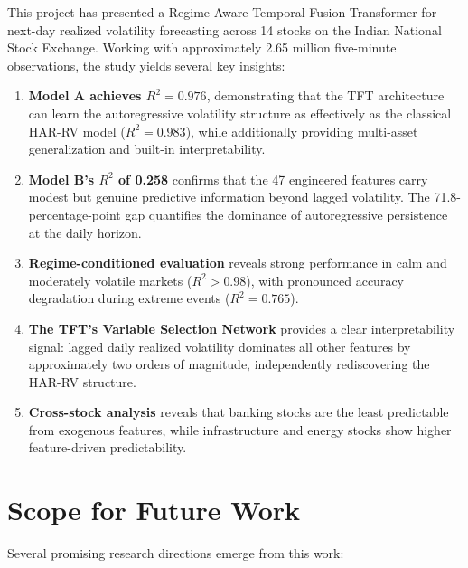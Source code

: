 This project has presented a Regime-Aware Temporal Fusion Transformer for next-day realized volatility forecasting across 14 stocks on the Indian National Stock Exchange. Working with approximately 2.65 million five-minute observations, the study yields several key insights:

\begin{enumerate}
    \item \textbf{Model A achieves $R^2 = 0.976$}, demonstrating that the TFT architecture can learn the autoregressive volatility structure as effectively as the classical HAR-RV model ($R^2 = 0.983$), while additionally providing multi-asset generalization and built-in interpretability.

    \item \textbf{Model B's $R^2$ of 0.258} confirms that the 47 engineered features carry modest but genuine predictive information beyond lagged volatility. The 71.8-percentage-point gap quantifies the dominance of autoregressive persistence at the daily horizon.

    \item \textbf{Regime-conditioned evaluation} reveals strong performance in calm and moderately volatile markets ($R^2 > 0.98$), with pronounced accuracy degradation during extreme events ($R^2 = 0.765$).

    \item \textbf{The TFT's Variable Selection Network} provides a clear interpretability signal: lagged daily realized volatility dominates all other features by approximately two orders of magnitude, independently rediscovering the HAR-RV structure.

    \item \textbf{Cross-stock analysis} reveals that banking stocks are the least predictable from exogenous features, while infrastructure and energy stocks show higher feature-driven predictability.
\end{enumerate}

\pagebreak
\section{Scope for Future Work}

Several promising research directions emerge from this work:

